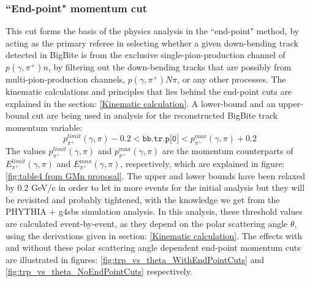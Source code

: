 \subsubsection{``End-point" momentum cut}\label{End-point momentum cut}
This cut forms the basis of the physics analysis in the ``end-point" method, by acting as the primary referee in selecting whether a given down-bending track detected in BigBite is from the exclusive single-pion-production channel of $p(\gamma,\pi^+)n$, by filtering out the down-bending tracks that are possibly from multi-pion-production channels, $p(\gamma,\pi^+)N\pi$, or any other processes. The kinematic calculations and principles that lies behind the end-point cuts are explained in the section: \ref{Kinematic calculation}. A lower-bound and an upper-bound cut are being used in analysis for the reconstructed BigBite track momentum variable:
\begin{equation}
    p_{\pi^+}^{limit} (\gamma,\pi) - 0.2 < \texttt{bb.tr.p[0]} < p_{\pi^+}^{max} (\gamma,\pi) + 0.2
\end{equation}
The values $p_{\pi^+}^{limit} (\gamma,\pi)$ and $p_{\pi^+}^{max} (\gamma,\pi)$ are the momentum counterparts of $E_{\pi^+}^{limit} (\gamma,\pi)$ and $E_{\pi^+}^{max} (\gamma,\pi)$, respectively, which are explained in figure: \ref{fig:table4 from GMn proposal}. The upper and lower bounds have been relaxed by 0.2 GeV/c in order to let in more events for the initial analysis but they will be revisited and probably tightened, with the knowledge we get from the PHYTHIA + g4sbs simulation analysis. In this analysis, these threshold values are calculated event-by-event, as they depend on the polar scattering angle $\theta$, using the derivations given in section: \ref{Kinematic calculation}. The effects with and without these polar scattering angle dependent end-point momentum cuts are illustrated in figures: \ref{fig:trp_vs_theta_WithEndPointCuts} and \ref{fig:trp_vs_theta_NoEndPointCuts} respectively. 

